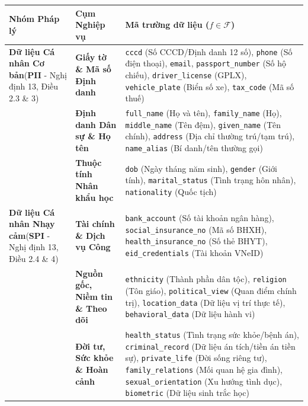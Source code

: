 \documentclass[
  11pt,
  a4paper,
]{article}
\newcounter{none} %
\begin{document}
{\def\LTcaptype{none} %
\begin{longtable}[]{@{}
  >{\raggedright\arraybackslash}p{}
  >{\raggedright\arraybackslash}p{}
  >{\raggedright\arraybackslash}p{}@{}}
\toprule\noalign{}
\begin{minipage}[b]{\linewidth}\raggedright
Nhóm Pháp lý
\end{minipage} & \begin{minipage}[b]{\linewidth}\raggedright
Cụm Nghiệp vụ
\end{minipage} & \begin{minipage}[b]{\linewidth}\raggedright
Mã trường dữ liệu (\(f \in \mathcal{F}\))
\end{minipage} \\
\midrule\noalign{}
\endhead
\bottomrule\noalign{}
\endlastfoot
\textbf{Dữ liệu Cá nhân Cơ bản}(\textbf{PII} - Nghị định 13, Điều 2.3 \& 3) & \textbf{Giấy tờ \& Mã
số Định danh} & \texttt{cccd} (Số CCCD/Định danh 12 số), \texttt{phone} (Số điện thoại),
\texttt{email}, \texttt{passport\_number} (Số hộ chiếu), \texttt{driver\_license} (GPLX),
\texttt{vehicle\_plate} (Biển số xe), \texttt{tax\_code} (Mã số thuế) \\
& \textbf{Định danh Dân sự \& Họ tên} & \texttt{full\_name} (Họ và tên), \texttt{family\_name} (Họ),
\texttt{middle\_name} (Tên đệm), \texttt{given\_name} (Tên chính), \texttt{address} (Địa chỉ thường
trú/tạm trú), \texttt{name\_alias} (Bí danh/tên thường gọi) \\
& \textbf{Thuộc tính Nhân khẩu học} & \texttt{dob} (Ngày tháng năm sinh), \texttt{gender} (Giới
tính), \texttt{marital\_status} (Tình trạng hôn nhân), \texttt{nationality} (Quốc tịch) \\
\textbf{Dữ liệu Cá nhân Nhạy cảm}(\textbf{SPI} - Nghị định 13, Điều 2.4 \& 4) & \textbf{Tài chính \&
Dịch vụ Công} & \texttt{bank\_account} (Số tài khoản ngân hàng), \texttt{social\_insurance\_no} (Mã
số BHXH), \texttt{health\_insurance\_no} (Số thẻ BHYT), \texttt{eid\_credentials} (Tài khoản
VNeID) \\
& \textbf{Nguồn gốc, Niềm tin \& Theo dõi} & \texttt{ethnicity} (Thành phần dân tộc),
\texttt{religion} (Tôn giáo), \texttt{political\_view} (Quan điểm chính trị),
\texttt{location\_data} (Dữ liệu vị trí thực tế), \texttt{behavioral\_data} (Dữ liệu hành vi) \\
& \textbf{Đời tư, Sức khỏe \& Hoàn cảnh} & \texttt{health\_status} (Tình trạng sức khỏe/bệnh án),
\texttt{criminal\_record} (Dữ liệu án tích/tiền án tiền sự), \texttt{private\_life} (Đời sống riêng
tư), \texttt{family\_relations} (Mối quan hệ gia đình), \texttt{sexual\_orientation} (Xu hướng tình
dục), \texttt{biometric} (Dữ liệu sinh trắc học) \\
\end{longtable}
}
\end{document}

